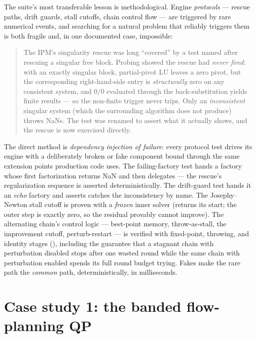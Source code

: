 The suite's most transferable lesson is methodological. Engine
\emph{protocols} --- rescue paths, drift guards, stall cutoffs, chain
control flow --- are triggered by rare numerical events, and searching for
a natural problem that reliably triggers them is both fragile and, in one
documented case, impossible:

\begin{quote}
The IPM's singularity rescue was long ``covered'' by a test named after
rescuing a singular free block. Probing showed the rescue had \emph{never
fired}: with an exactly singular block, partial-pivot LU leaves a zero
pivot, but the corresponding right-hand-side entry is \emph{structurally}
zero on any consistent system, and $0/0$ evaluated through the
back-substitution yields finite results --- so the non-finite trigger never
trips. Only an \emph{inconsistent} singular system (which the surrounding
algorithm does not produce) throws NaNs. The test was renamed to assert
what it actually shows, and the rescue is now exercised directly.
\end{quote}

The direct method is \emph{dependency injection of failure}: every protocol
test drives its engine with a deliberately broken or fake component bound
through the same extension points production code uses. The
failing-factory test hands  a factory whose first
factorization returns NaN and then delegates --- the rescue's
regularization sequence is asserted deterministically. The drift-guard test
hands it an \emph{echo} factory and asserts  catches
the inconsistency by name. The Josephy--Newton stall cutoff is proven with
a \emph{frozen} inner solver (returns its start; the outer step is exactly
zero, so the residual provably cannot improve). The alternating chain's
control logic --- best-point memory, throw-as-stall, the improvement
cutoff, perturb-restart --- is verified with fixed-point, throwing, and
identity stages (), including the guarantee
that a stagnant chain with perturbation disabled stops after one wasted
round while the same chain with perturbation enabled spends its full round
budget trying. Fakes make the rare path the \emph{common} path,
deterministically, in milliseconds.

\section{Case study 1: the banded flow-planning QP}
\label{sec:t-flow}

